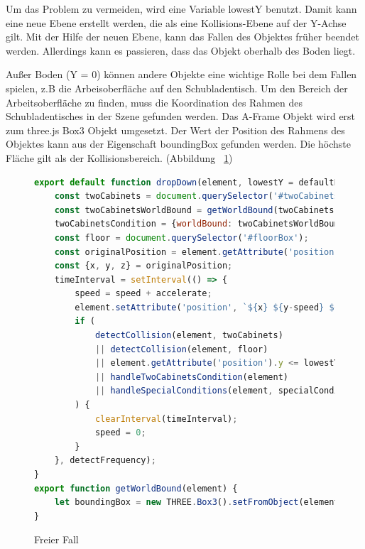   Um das Problem zu vermeiden, wird eine Variable {\selectfont lowestY} benutzt. Damit kann eine neue Ebene erstellt werden, die als eine Kollisions-Ebene auf der Y-Achse gilt. Mit der Hilfe der neuen Ebene, kann das Fallen des Objektes früher beendet werden. Allerdings kann es passieren, dass das Objekt oberhalb des Boden liegt.
  
  Außer Boden (Y = 0) können andere Objekte eine wichtige Rolle bei dem Fallen spielen, z.B die Arbeisoberfläche auf den Schubladentisch. Um den Bereich der Arbeitsoberfläche zu finden, muss die Koordination des Rahmen des Schubladentisches in der Szene gefunden werden. Das A-Frame Objekt wird erst zum three.js Box3 Objekt umgesetzt. Der Wert der Position des Rahmens des Objektes kann aus der Eigenschaft {\selectfont boundingBox} gefunden werden. Die höchste Fläche gilt als der Kollisionsbereich. (Abbildung ~\ref{fig:fallDown})
  
\begin{figure}[ht]
\vspace*{1em}
\centering
\caption[Freier Fall]{Freier Fall}
\begin{lstlisting}[language=JavaScript, style=htmlcssjs]
export default function dropDown(element, lowestY = defaultLowestY, specialConditions = []) {
    const twoCabinets = document.querySelector('#twoCabinets');
    const twoCabinetsWorldBound = getWorldBound(twoCabinets);
    twoCabinetsCondition = {worldBound: twoCabinetsWorldBound, lowestY: twoCabinetsWorldBound.max.y + defaultLowestY};
    const floor = document.querySelector('#floorBox');
    const originalPosition = element.getAttribute('position');
    const {x, y, z} = originalPosition;
    timeInterval = setInterval(() => {
        speed = speed + accelerate;
        element.setAttribute('position', `${x} ${y-speed} ${z}`);
        if (
            detectCollision(element, twoCabinets)
            || detectCollision(element, floor)
            || element.getAttribute('position').y <= lowestY
            || handleTwoCabinetsCondition(element)
            || handleSpecialConditions(element, specialConditions)
        ) {
            clearInterval(timeInterval);
            speed = 0;
        }
    }, detectFrequency);
}
export function getWorldBound(element) {
    let boundingBox = new THREE.Box3().setFromObject(element.object3D);
}
\end{lstlisting}
\label{fig:fallDown} 
\end{figure}
  
